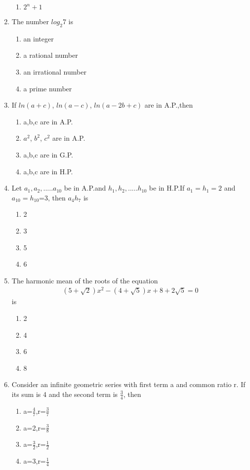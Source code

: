 \begin{enumerate}[label=\arabic*.,ref=\thesubsection.\theenumi]
\begin{enumerate}
 \item $2^n+1$
  \end{enumerate}
\item The number $log_2$7 is
   \begin{enumerate}
\item an integer 
\item a rational number 
\item an irrational number  
\item a prime number
   \end{enumerate}
  \item If $ln(a+c)$, $ln(a-c)$, $ln(a-2b+c)$ are in A.P.,then
 \begin{enumerate} 
\item a,b,c are in A.P. 
\item $a^2$, $b^2$, $c^2$ are in A.P.
\item a,b,c are in G.P. 
\item a,b,c are in H.P.
 \end{enumerate}
  \item Let $a_1,a_2,.....a_10$ be in A.P.and $h_1,h_2,.....h_{10}$ be in H.P.If $a_1=h_1=2$ and $a_{10}=h_{10}$=3, then $a_4 h_7$ is
 \begin{enumerate}
\item 2
\item 3 
\item 5 
\item 6
\end{enumerate}
  \item The harmonic mean of the roots of the equation 
  \begin{align}
  (5+\sqrt{2})x^2- (4+\sqrt{5})x+ 8 + 2\sqrt{5}=0
  \end{align} is
\begin{enumerate}
\item 2
\item 4 
\item 6 
\item 8
\end{enumerate}
\item Consider an infinite geometric series with first term a and common ratio r. If its sum is 4 and the second term is $\frac{3}{4}$, then
\begin{enumerate}
\item a=$\frac{4}{7}$,r=$\frac{3}{7}$ 
\item a=2,r=$\frac{3}{8}$
\item a=$\frac{3}{2}$,r=$\frac{1}{2}$
\item a=3,r=$\frac{1}{4}$

\end{enumerate}
\end{enumerate}
